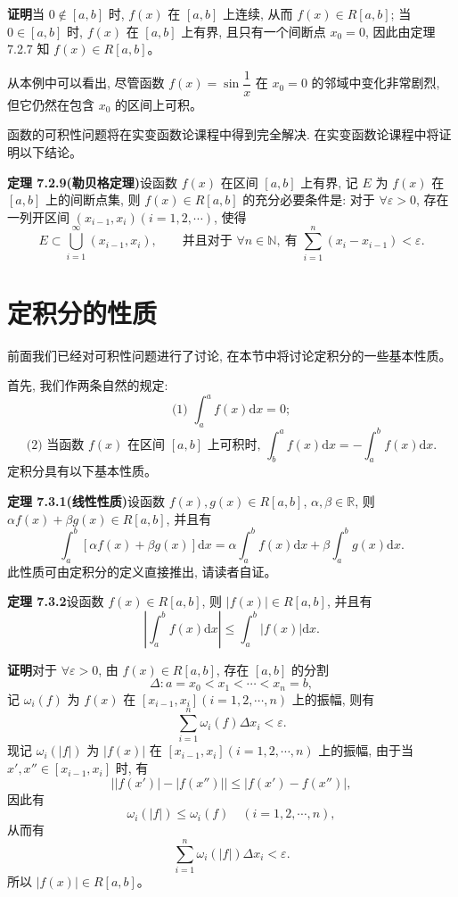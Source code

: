 \documentclass[UTF8, 12pt, fontset=fandol, oneside]{ctexart}
\begin{document}
\noindent\textbf{证明}\quad 当 $0\notin[a,b]$ 时, $f(x)$ 在 $[a,b]$ 上连续, 从而 $f(x)\in R[a,b]$; 当 $0\in[a,b]$ 时, $f(x)$ 在 $[a,b]$ 上有界, 且只有一个间断点 $x_0=0$, 因此由定理 7.2.7 知 $f(x)\in R[a,b]$。

从本例中可以看出, 尽管函数 $f(x)=\sin\dfrac{1}{x}$ 在 $x_0=0$ 的邻域中变化非常剧烈, 但它仍然在包含 $x_0$ 的区间上可积。

函数的可积性问题将在实变函数论课程中得到完全解决. 在实变函数论课程中将证明以下结论。

\noindent\textbf{定理 7.2.9(勒贝格定理)}\quad 设函数 $f(x)$ 在区间 $[a,b]$ 上有界, 记 $E$ 为 $f(x)$ 在 $[a,b]$ 上的间断点集, 则 $f(x)\in R[a,b]$ 的充分必要条件是: 对于 $\forall\varepsilon>0$, 存在一列开区间 $(x_{i-1},x_i)(i=1,2,\cdots)$, 使得
\[
  E\subset \bigcup_{i=1}^{\infty}(x_{i-1},x_i),
  \qquad
  \text{并且对于 } \forall n\in\mathbb N,\ \text{有 } \sum_{i=1}^n(x_i-x_{i-1})<\varepsilon.
\]

\section{定积分的性质}

前面我们已经对可积性问题进行了讨论, 在本节中将讨论定积分的一些基本性质。

首先, 我们作两条自然的规定:
\[
  \text{(1) }\int_a^a f(x)\mathrm dx=0;
\]
\[
  \text{(2) 当函数 } f(x) \text{ 在区间 } [a,b] \text{ 上可积时, }
  \int_b^a f(x)\mathrm dx=-\int_a^b f(x)\mathrm dx.
\]
定积分具有以下基本性质。

\noindent\textbf{定理 7.3.1(线性性质)}\quad 设函数 $f(x),g(x)\in R[a,b]$, $\alpha,\beta\in\mathbb R$, 则 $\alpha f(x)+\beta g(x)\in R[a,b]$, 并且有
\[
  \int_a^b[\alpha f(x)+\beta g(x)]\mathrm dx
  =\alpha\int_a^b f(x)\mathrm dx+\beta\int_a^b g(x)\mathrm dx.
\]
此性质可由定积分的定义直接推出, 请读者自证。

\noindent\textbf{定理 7.3.2}\quad 设函数 $f(x)\in R[a,b]$, 则 $|f(x)|\in R[a,b]$, 并且有
\[
  \left|\int_a^b f(x)\mathrm dx\right|\leq \int_a^b |f(x)|\mathrm dx.
\]

\noindent\textbf{证明}\quad 对于 $\forall\varepsilon>0$, 由 $f(x)\in R[a,b]$, 存在 $[a,b]$ 的分割
\[
  \Delta:a=x_0<x_1<\cdots<x_n=b,
\]
记 $\omega_i(f)$ 为 $f(x)$ 在 $[x_{i-1},x_i](i=1,2,\cdots,n)$ 上的振幅, 则有
\[
  \sum_{i=1}^n \omega_i(f)\Delta x_i<\varepsilon.
\]
现记 $\omega_i(|f|)$ 为 $|f(x)|$ 在 $[x_{i-1},x_i](i=1,2,\cdots,n)$ 上的振幅, 由于当 $x',x''\in[x_{i-1},x_i]$ 时, 有
\[
  \bigl||f(x')|-|f(x'')|\bigr|\leq |f(x')-f(x'')|,
\]
因此有
\[
  \omega_i(|f|)\leq \omega_i(f)\quad(i=1,2,\cdots,n),
\]
从而有
\[
  \sum_{i=1}^n \omega_i(|f|)\Delta x_i<\varepsilon.
\]
所以 $|f(x)|\in R[a,b]$。
\end{document}
